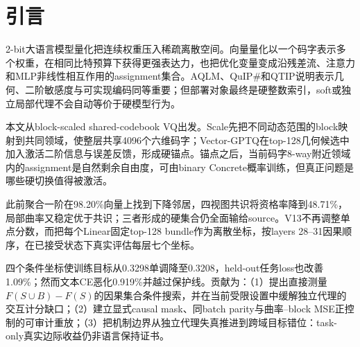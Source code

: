 \section{引言}

2-bit大语言模型量化把连续权重压入稀疏离散空间。向量量化以一个码字表示多个权重，在相同比特预算下获得更强表达力，也把优化变量变成沿残差流、注意力和MLP非线性相互作用的assignment集合。AQLM、QuIP\#和QTIP说明表示几何、二阶敏感度与可实现编码同等重要\cite{aqlm,quip,qtip}；但部署对象最终是硬整数索引，soft或独立局部代理不会自动等价于硬模型行为。

本文从block-scaled shared-codebook VQ出发。Scale先把不同动态范围的block映射到共同领域，使整层共享4096个六维码字；Vector-GPTQ在top-128几何候选中加入激活二阶信息与误差反馈，形成硬锚点。锚点之后，当前码字8-way附近领域内的assignment是自然剩余自由度，可由binary Concrete概率训练，但真正问题是哪些硬切换值得被激活。

此前聚合一阶在98.20\%向量上找到下降邻居，四视图共识将资格率降到48.71\%，局部曲率又稳定优于共识；三者形成的硬集合仍全面输给source。V13不再调整单点分数，而把每个Linear固定top-128 bundle作为离散坐标，按layers 28--31因果顺序，在已接受状态下真实评估每层七个坐标。

四个条件坐标使训练目标从0.3298单调降至0.3208，held-out任务loss也改善1.09\%；然而文本CE恶化0.919\%并越过保护线。贡献为：（1）提出直接测量$F(S\cup B)-F(S)$的因果集合条件搜索，并在当前受限设置中缓解独立代理的交互计分缺口；（2）建立显式causal mask、同batch parity与曲率--block MSE正控制的可审计重放；（3）把机制边界从独立代理失真推进到跨域目标错位：task-only真实边际收益仍非语言保持证书。
